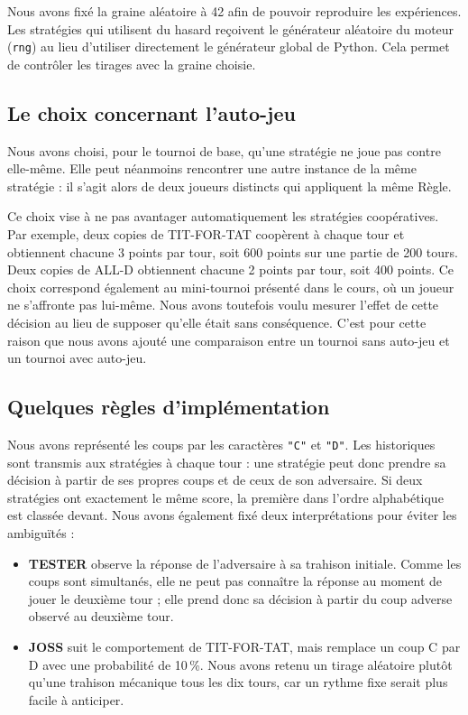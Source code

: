 \documentclass[10pt,a4paper]{article}
\begin{document}
Nous avons fixé la graine aléatoire à 42 afin de pouvoir reproduire les expériences. Les stratégies qui utilisent du hasard
reçoivent le générateur aléatoire du moteur (\texttt{rng}) au lieu d'utiliser directement le générateur global de Python. Cela
permet de contrôler les tirages avec la graine choisie.

\subsection{Le choix concernant l'auto-jeu}
Nous avons choisi, pour le tournoi de base, qu'une stratégie ne joue pas contre elle-même. Elle peut néanmoins rencontrer une
autre instance de la même stratégie : il s'agit alors de deux joueurs distincts qui appliquent la même Règle.

Ce choix vise à ne pas avantager automatiquement les stratégies coopératives. Par exemple, deux copies de TIT-FOR-TAT coopèrent
à chaque tour et obtiennent chacune 3 points par tour, soit 600 points sur une partie de 200 tours. Deux copies de ALL-D
obtiennent chacune 2 points par tour, soit 400 points. Ce choix correspond également au mini-tournoi présenté dans le cours, où
un joueur ne s'affronte pas lui-même. Nous avons toutefois voulu mesurer l'effet de cette décision au lieu de supposer qu'elle
était sans conséquence. C'est pour cette raison que nous avons ajouté une comparaison entre un tournoi sans auto-jeu et un
tournoi avec auto-jeu.

\subsection{Quelques règles d'implémentation}
Nous avons représenté les coups par les caractères \texttt{"C"} et \texttt{"D"}. Les historiques sont transmis aux stratégies à
chaque tour : une stratégie peut donc prendre sa décision à partir de ses propres coups et de ceux de son adversaire. Si deux
stratégies ont exactement le même score, la première dans l'ordre alphabétique est classée devant. Nous avons également fixé
deux interprétations pour éviter les ambiguïtés :
\begin{itemize}
  \item \textbf{TESTER} observe la réponse de l'adversaire à sa trahison initiale. Comme les coups sont simultanés, elle ne
  peut pas connaître la réponse au moment de jouer le deuxième tour ; elle prend donc sa décision à partir du coup adverse
  observé au deuxième tour.
  \item \textbf{JOSS} suit le comportement de TIT-FOR-TAT, mais remplace un coup C par D avec une probabilité de 10\,\%. Nous
  avons retenu un tirage aléatoire plutôt qu'une trahison mécanique tous les dix tours, car un rythme fixe serait plus facile à
  anticiper.
\end{itemize}
\end{document}
